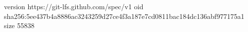 version https://git-lfs.github.com/spec/v1
oid sha256:5ee437b4a8886ac3243259d27ce4f3a187e7cd0811bac184dc136abf977175a1
size 55838
